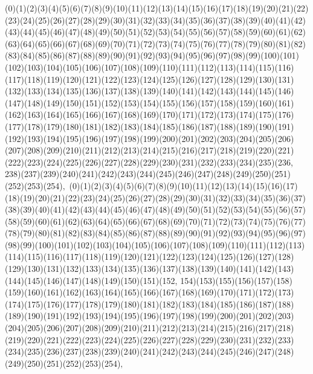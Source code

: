 \documentclass[12pt]{article}
\begin{document}
{(0)(1)(2)(3)(4)(5)(6)(7)(8)(9)(10)(11)(12)(13)(14)(15)(16)(17)(18)(19)(20)(21)(22)(23)(24)(25)(26)(27)(28)(29)(30)(31)(32)(33)(34)(35)(36)(37)(38)(39)(40)(41)(42)(43)(44)(45)(46)(47)(48)(49)(50)(51)(52)(53)(54)(55)(56)(57)(58)(59)(60)(61)(62)(63)(64)(65)(66)(67)(68)(69)(70)(71)(72)(73)(74)(75)(76)(77)(78)(79)(80)(81)(82)(83)(84)(85)(86)(87)(88)(89)(90)(91)(92)(93)(94)(95)(96)(97)(98)(99)(100)(101)(102)(103)(104)(105)(106)(107)(108)(109)(110)(111)(112)(113)(114)(115)(116)(117)(118)(119)(120)(121)(122)(123)(124)(125)(126)(127)(128)(129)(130)(131)(132)(133)(134)(135)(136)(137)(138)(139)(140)(141)(142)(143)(144)(145)(146)(147)(148)(149)(150)(151)(152)(153)(154)(155)(156)(157)(158)(159)(160)(161)(162)(163)(164)(165)(166)(167)(168)(169)(170)(171)(172)(173)(174)(175)(176)(177)(178)(179)(180)(181)(182)(183)(184)(185)(186)(187)(188)(189)(190)(191)(192)(193)(194)(195)(196)(197)(198)(199)(200)(201)(202)(203)(204)(205)(206)(207)(208)(209)(210)(211)(212)(213)(214)(215)(216)(217)(218)(219)(220)(221)(222)(223)(224)(225)(226)(227)(228)(229)(230)(231)(232)(233)(234)(235)(236, 238)(237)(239)(240)(241)(242)(243)(244)(245)(246)(247)(248)(249)(250)(251)(252)(253)(254)$
, 
$
(0)(1)(2)(3)(4)(5)(6)(7)(8)(9)(10)(11)(12)(13)(14)(15)(16)(17)(18)(19)(20)(21)(22)(23)(24)(25)(26)(27)(28)(29)(30)(31)(32)(33)(34)(35)(36)(37)(38)(39)(40)(41)(42)(43)(44)(45)(46)(47)(48)(49)(50)(51)(52)(53)(54)(55)(56)(57)(58)(59)(60)(61)(62)(63)(64)(65)(66)(67)(68)(69)(70)(71)(72)(73)(74)(75)(76)(77)(78)(79)(80)(81)(82)(83)(84)(85)(86)(87)(88)(89)(90)(91)(92)(93)(94)(95)(96)(97)(98)(99)(100)(101)(102)(103)(104)(105)(106)(107)(108)(109)(110)(111)(112)(113)(114)(115)(116)(117)(118)(119)(120)(121)(122)(123)(124)(125)(126)(127)(128)(129)(130)(131)(132)(133)(134)(135)(136)(137)(138)(139)(140)(141)(142)(143)(144)(145)(146)(147)(148)(149)(150)(151)(152, 154)(153)(155)(156)(157)(158)(159)(160)(161)(162)(163)(164)(165)(166)(167)(168)(169)(170)(171)(172)(173)(174)(175)(176)(177)(178)(179)(180)(181)(182)(183)(184)(185)(186)(187)(188)(189)(190)(191)(192)(193)(194)(195)(196)(197)(198)(199)(200)(201)(202)(203)(204)(205)(206)(207)(208)(209)(210)(211)(212)(213)(214)(215)(216)(217)(218)(219)(220)(221)(222)(223)(224)(225)(226)(227)(228)(229)(230)(231)(232)(233)(234)(235)(236)(237)(238)(239)(240)(241)(242)(243)(244)(245)(246)(247)(248)(249)(250)(251)(252)(253)(254)$
, 
$
}
\end{document}
